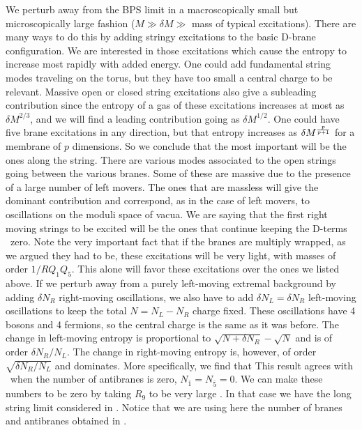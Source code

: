 We perturb away from the BPS limit in a macroscopically small but
microscopically large fashion ($ M \gg \delta M \gg $ mass of typical
excitations).  There are many ways to do this by adding stringy
excitations to the basic D-brane configuration. We are interested in those
excitations which cause the entropy to increase most rapidly with added energy.
One could add fundamental string modes traveling on the torus, but they have
too small a central charge to be relevant. Massive open or closed string
excitations also give a subleading contribution since the entropy of a gas
of these excitations increases at most as $\delta M^{2/3}$, and we will
find a leading  contribution going as $\delta M^{1/2}$.
One could have five brane excitations in any direction, but that entropy
increases as $\delta M ^{p \over p+1 } $ for a membrane
of $p$ dimensions. So  we conclude  that the most
important will be the ones along the string.
There are various  modes associated to the open strings going between
the various branes. Some of these are massive due to the presence
of a large number of left movers. The ones that are massless will
give the dominant contribution and correspond, as in the case of
left movers, to  oscillations on the moduli space of vacua. 
We are saying that  the first right moving strings to be 
excited will be the ones that continue keeping the 
D-terms \dfull\ zero. 
Note the very important fact that if the branes are multiply wrapped,
as we argued they had to be, these excitations will be very 
light, with masses of order $ 1/RQ_1Q_5 $. This alone will favor these
excitations over the ones we listed above. 
If we perturb away from a purely left-moving extremal background by adding
$\delta N_R$ right-moving oscillations, we also have to add
$\delta N_L=\delta N_R $ left-moving oscillations to keep the total
$N= N_L-N_R$ charge fixed. These oscillations have 4 bosons and 4 fermions,
so the central charge is the  same as it was before. The change in
left-moving entropy is proportional to $\sqrt{ N + \delta N_R }- \sqrt N $
and is of order $\delta N_R/N_L$. The change in right-moving entropy is, 
however,
of order $\sqrt{\delta N_R/N_L}$ and dominates.
More specifically, we find that
\eqn{}
This result agrees with \smira\ when the number of antibranes
is zero, $N_{\bar 1}= N_{\bar 5}=0$. We can make these numbers
to be zero by taking $R_9$ to be very large \dbranes . In that case we have
the long string limit considered in \hstro . 
Notice that we are using here the number of branes and antibranes
obtained in \dbranes .


